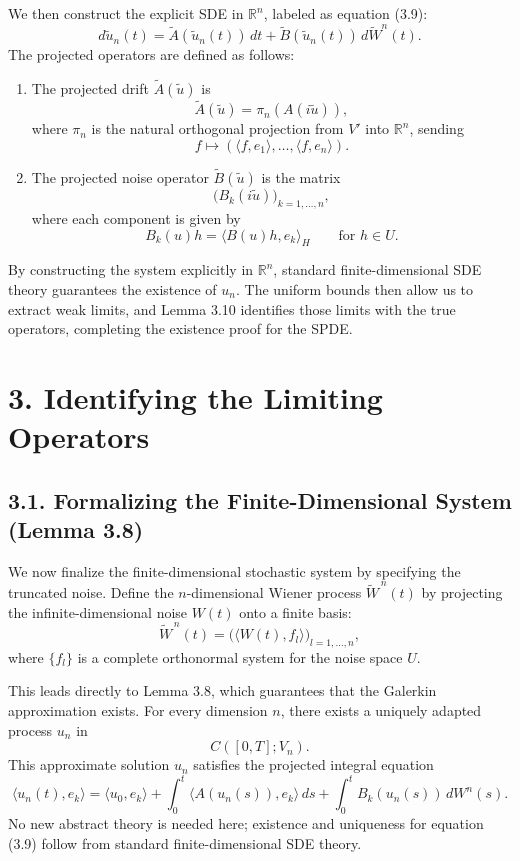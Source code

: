\documentclass[11pt]{article}
\theoremstyle{definition}
\theoremstyle{remark}
\begin{document}
We then construct the explicit SDE in \(\mathbb R^n\), labeled as equation (3.9):
\[
d\widetilde u_n(t)=\widetilde A(\widetilde u_n(t))\,dt+\widetilde B(\widetilde u_n(t))\,d\widetilde W^n(t).
\]
The projected operators are defined as follows:
\begin{enumerate}
\item The projected drift \(\widetilde A(\widetilde u)\) is
\[
\widetilde A(\widetilde u)=\pi_n(A(i\widetilde u)),
\]
where \(\pi_n\) is the natural orthogonal projection from \(V'\) into \(\mathbb R^n\), sending
\[
f\mapsto (\langle f,e_1\rangle,\dots,\langle f,e_n\rangle).
\]

\item The projected noise operator \(\widetilde B(\widetilde u)\) is the matrix
\[
\bigl(B_k(i\widetilde u)\bigr)_{k=1,\dots,n},
\]
where each component is given by
\[
B_k(u)h=\langle B(u)h,e_k\rangle_H
\qquad
\text{for } h\in U.
\]
\end{enumerate}

By constructing the system explicitly in \(\mathbb R^n\), standard finite-dimensional SDE theory guarantees the existence of \(u_n\). The uniform bounds then allow us to extract weak limits, and Lemma 3.10 identifies those limits with the true operators, completing the existence proof for the SPDE.

\section*{3. Identifying the Limiting Operators}

\subsection*{3.1. Formalizing the Finite-Dimensional System (Lemma 3.8)}
We now finalize the finite-dimensional stochastic system by specifying the truncated noise. Define the \(n\)-dimensional Wiener process \(\widetilde W^{\,n}(t)\) by projecting the infinite-dimensional noise \(W(t)\) onto a finite basis:
\[
\widetilde W^{\,n}(t)=\bigl(\langle W(t),f_l\rangle\bigr)_{l=1,\dots,n},
\]
where \(\{f_l\}\) is a complete orthonormal system for the noise space \(U\).

This leads directly to Lemma 3.8, which guarantees that the Galerkin approximation exists. For every dimension \(n\), there exists a uniquely adapted process \(u_n\) in
\[
C([0,T];V_n).
\]
This approximate solution \(u_n\) satisfies the projected integral equation
\[
\langle u_n(t),e_k\rangle
=
\langle u_0,e_k\rangle
+
\int_0^t \langle A(u_n(s)),e_k\rangle\,ds
+
\int_0^t B_k(u_n(s))\,dW^n(s).
\]
No new abstract theory is needed here; existence and uniqueness for equation (3.9) follow from standard finite-dimensional SDE theory.
\end{document}
